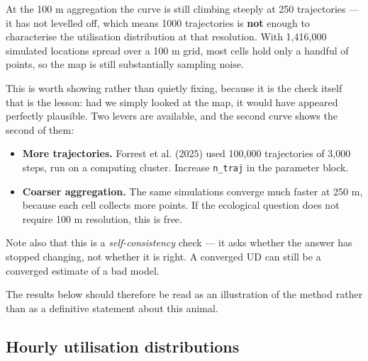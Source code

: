 \documentclass[
  letterpaper,
  DIV=11,
  numbers=noendperiod]{scrartcl}
\providecommand{\tightlist}{%
  \setlength{\itemsep}{0pt}\setlength{\parskip}{0pt}}
\begin{document}
\begin{tcolorbox}[enhanced jigsaw, arc=.35mm, bottomrule=.15mm, bottomtitle=1mm, breakable, colback=white, colbacktitle=quarto-callout-important-color!10!white, colframe=quarto-callout-important-color-frame, coltitle=black, left=2mm, leftrule=.75mm, opacityback=0, opacitybacktitle=0.6, rightrule=.15mm, title=\textcolor{quarto-callout-important-color}{\faExclamation}\hspace{0.5em}{This simulation has \emph{not} converged}, titlerule=0mm, toprule=.15mm, toptitle=1mm]

At the 100 m aggregation the curve is still climbing steeply at 250
trajectories --- it has not levelled off, which means 1000 trajectories
is \textbf{not} enough to characterise the utilisation distribution at
that resolution. With 1,416,000 simulated locations spread over a 100 m
grid, most cells hold only a handful of points, so the map is still
substantially sampling noise.

This is worth showing rather than quietly fixing, because it is the
check itself that is the lesson: had we simply looked at the map, it
would have appeared perfectly plausible. Two levers are available, and
the second curve shows the second of them:

\begin{itemize}
\tightlist
\item
  \textbf{More trajectories.} Forrest et al. (2025) used 100,000
  trajectories of 3,000 steps, run on a computing cluster. Increase
  \texttt{n\_traj} in the parameter block.
\item
  \textbf{Coarser aggregation.} The same simulations converge much
  faster at 250 m, because each cell collects more points. If the
  ecological question does not require 100 m resolution, this is free.
\end{itemize}

Note also that this is a \emph{self-consistency} check --- it asks
whether the answer has stopped changing, not whether it is right. A
converged UD can still be a converged estimate of a bad model.

\end{tcolorbox}

The results below should therefore be read as an illustration of the
method rather than as a definitive statement about this animal.

\subsection{Hourly utilisation
distributions}\label{hourly-utilisation-distributions}
\end{document}
